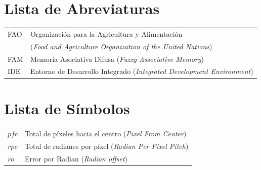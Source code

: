 \documentclass[12pt,oneside,a4paper]{book}
\begin{document}
\tableofcontents    %

\chapter{Lista de Abreviaturas}
\begin{tabular}{ll}
         FAO     & Organización para la Agricultura y Alimentación\\
         & (\emph{Food and Agriculture Organization of the United Nations})\\
         FAM    & Memoria Asociativa Difusa (\emph{Fuzzy Associative Memory})\\
         IDE 	 & Entorno de Desarrollo Integrado  (\emph{Integrated Development Environment}) \\
\end{tabular}

\chapter{Lista de Símbolos}
\begin{tabular}{ll}
         $pfc$   & Total de píxeles hacia el centro (\emph{Pixel From Center})\\
         $rpc $  & Total de radianes por píxel (\emph{Radian Per Pixel Pitch})\\
         $ro$    & Error por Radian (\emph{Radian offset})\\
\end{tabular}

\listoffigures            
\listoftables            

\mainmatter


\onehalfspacing            %

       



\end{document}

